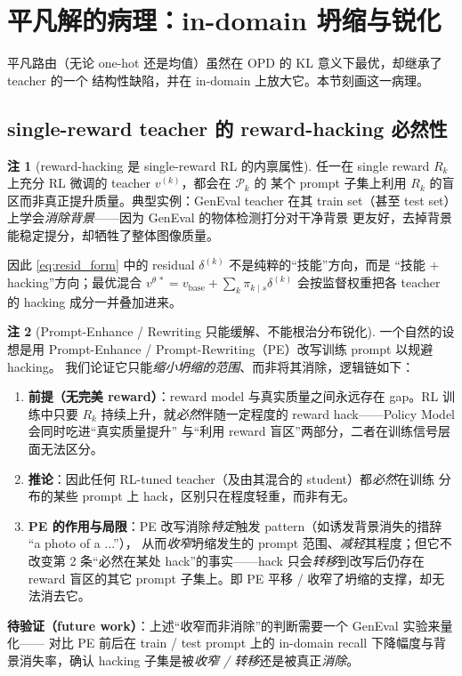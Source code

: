 \documentclass[11pt,a4paper]{article}
\newcommand{\base}{\mathrm{base}}
\newcommand{\stu}{\theta}
\theoremstyle{definition}
\newtheorem{remark}{注}
\begin{document}
\section{平凡解的病理：in-domain 坍缩与锐化}
\label{sec:pathology}

平凡路由（无论 one-hot 还是均值）虽然在 OPD 的 KL 意义下最优，却继承了 teacher 的一个
结构性缺陷，并在 in-domain 上放大它。本节刻画这一病理。

\subsection{single-reward teacher 的 reward-hacking 必然性}
\label{ssec:hacking}

\begin{remark}[reward-hacking 是 single-reward RL 的内禀属性]
\label{rem:hacking}
任一在 single reward $R_k$ 上充分 RL 微调的 teacher $v^{(k)}$，都会在 $\mathcal{P}_k$ 的
某个 prompt 子集上利用 $R_k$ 的盲区而非真正提升质量。典型实例：GenEval teacher 在其
train set（甚至 test set）上学会\emph{消除背景}——因为 GenEval 的物体检测打分对干净背景
更友好，去掉背景能稳定提分，却牺牲了整体图像质量。
\end{remark}

因此 \eqref{eq:resid_form} 中的 residual $\delta^{(k)}$ 不是纯粹的``技能''方向，而是
``技能 $+$ hacking''方向；最优混合
$v^{\stu\,*}=v_{\base}+\sum_{k}\pi_{k\mid s}\delta^{(k)}$ 会按监督权重把各 teacher 的
hacking 成分一并叠加进来。

\begin{remark}[Prompt-Enhance / Rewriting 只能缓解、不能根治分布锐化]
\label{rem:pe}
一个自然的设想是用 Prompt-Enhance / Prompt-Rewriting（PE）改写训练 prompt 以规避 hacking。
我们论证它只能\emph{缩小坍缩的范围}、而非将其消除，逻辑链如下：
\begin{enumerate}[leftmargin=1.5em]
\item \textbf{前提（无完美 reward）}：reward model 与真实质量之间永远存在 gap。RL 训练中只要
$R_k$ 持续上升，就\emph{必然}伴随一定程度的 reward hack——Policy Model会同时吃进``真实质量提升''
与``利用 reward 盲区''两部分，二者在训练信号层面无法区分。
\item \textbf{推论}：因此任何 RL-tuned teacher（及由其混合的 student）都\emph{必然}在训练
分布的某些 prompt 上 hack，区别只在程度轻重，而非有无。
\item \textbf{PE 的作用与局限}：PE 改写消除\emph{特定}触发 pattern（如诱发背景消失的措辞 ``a photo of a ...''），
从而\emph{收窄}坍缩发生的 prompt 范围、\emph{减轻}其程度；但它不改变第 2 条``必然在某处
hack''的事实——hack 只会\emph{转移}到改写后仍存在 reward 盲区的其它 prompt 子集上。即 PE
平移 / 收窄了坍缩的支撑，却无法消去它。
\end{enumerate}
\textbf{待验证（future work）}：上述``收窄而非消除''的判断需要一个 GenEval 实验来量化——
对比 PE 前后在 train / test prompt 上的 in-domain recall 下降幅度与背景消失率，确认 hacking
子集是被\emph{收窄 / 转移}还是被真正\emph{消除}。
\end{remark}
\end{document}
